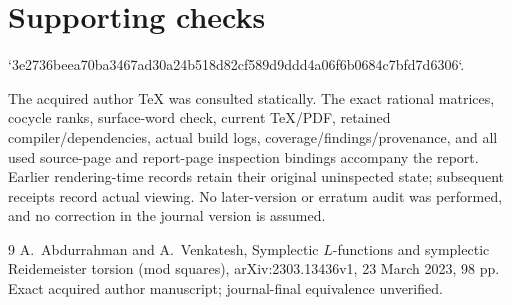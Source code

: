 \documentclass[10pt]{article}
\begin{document}
\section*{Supporting checks}
`3e2736beea70ba3467ad30a24b518d82cf589d9ddd4a06f6b0684c7bfd7d6306`.\par
The acquired author TeX was consulted statically. The exact rational matrices, cocycle ranks, surface-word check, current TeX/PDF, retained compiler/dependencies, actual build logs, coverage/findings/provenance, and all used source-page and report-page inspection bindings accompany the report. Earlier rendering-time records retain their original uninspected state; subsequent receipts record actual viewing. No later-version or erratum audit was performed, and no correction in the journal version is assumed.\par
9 A. Abdurrahman and A. Venkatesh, Symplectic \(L\)-functions and symplectic Reidemeister torsion (mod squares), arXiv:2303.13436v1, 23 March 2023, 98 pp. Exact acquired author manuscript; journal-final equivalence unverified.\par
\end{document}
